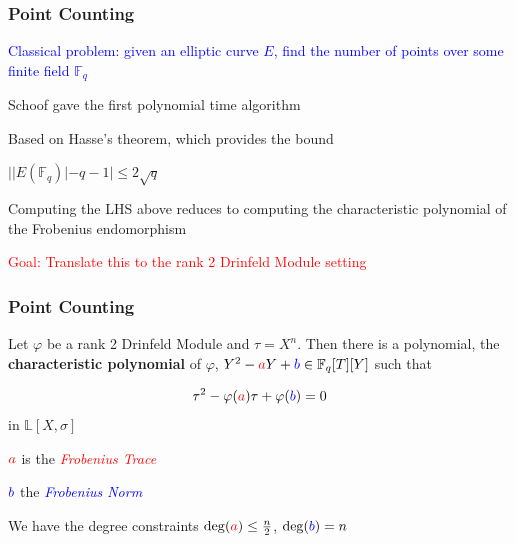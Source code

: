 \documentclass{beamer}
\newcommand{\blue}{\textcolor{blue}}
\newcommand{\red}{\textcolor{red}}
\newcommand{\spa}{\vspace{0.2cm}}
\newcommand{\red}{\textnormal{red}}
\newcommand{\spa}{\textnormal{ }}
\begin{document}
\begin{frame}
\frametitle{Point Counting}


 \blue{Classical problem: given an elliptic curve $E$, find the number of points over some finite field $\mathbb{F}_q$} 
 
 \spa
 
Schoof gave the first polynomial time algorithm

\spa

Based on Hasse's theorem, which provides the bound 

\centerline {$ | |E(\mathbb{F}_q)| - q - 1  | \leq 2 \sqrt{q} $}

\spa

 Computing the LHS above reduces to computing the characteristic polynomial of the Frobenius endomorphism
 
 \spa
\red{Goal: Translate this to the rank 2 Drinfeld Module setting}


\end{frame}









\begin{frame}
\frametitle{Point Counting}

\begin{theorem}[Gekeler, 1991]
Let $\varphi$ be a rank 2 Drinfeld Module and $\tau = X^n$. Then there is a polynomial, the \textbf{characteristic polynomial} of $\varphi$,  $Y^2 - \red{a}Y +\blue{b} \in \mathbb{F}_q[T][Y]$ such that

\[\tau^2 -\varphi(\red{a})\tau + \varphi(\blue{b}) = 0\]
in $\mathbb{L}[X,\sigma]$
\end{theorem}

\spa

$\red{a}$ is the \red{\textit{Frobenius Trace}}

\spa

$\blue{b}$ the \blue{\textit{Frobenius Norm}}

\spa

We have the degree constraints $\deg(\red{a}) \leq \frac{n}{2}$, $\deg(\blue{b}) = n$


\end{frame}
\end{document}
